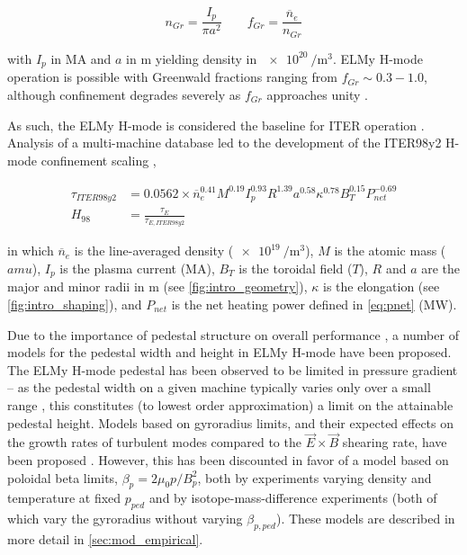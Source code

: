 \begin{equation}\label{eq:GDL}
  n_{Gr} = \frac{I_p}{\pi a^2} \qquad f_{Gr} = \frac{\overline{n}_e}{n_{Gr}}
\end{equation}

\noindent with $I_p$ in $\si{\mega\ampere}$ and $a$ in $\si{\meter}$ yielding density in $\SI{e20}{\per\meter\cubed}$.  ELMy H-mode operation is possible with Greenwald fractions ranging from $f_{Gr} \sim 0.3-1.0$, although confinement degrades severely as $f_{Gr}$ approaches unity \cite{Saibene1999}.

  As such, the ELMy H-mode is considered the baseline for ITER operation \cite{ITER1999,Shimada2007}.  Analysis of a multi-machine database \cite{Christiansen1992} led to the development of the ITER98y2 H-mode confinement scaling \cite{ITER1999},

\begin{align}
 \tau_{ITER98y2} &= 0.0562 \times \overline{n}_e^{0.41} M^{0.19} I_p^{0.93} R^{1.39} a^{0.58} \kappa^{0.78} B_T^{0.15} P_{net}^{-0.69}\label{eq:tau98}\\
 H_{98} &= \frac{\tau_E}{\tau_{E,ITER98y2}}\label{eq:H98}
\end{align}

\noindent in which $\overline{n}_e$ is the line-averaged density ($\SI{e19}{\per\meter\cubed}$), $M$ is the atomic mass ($\si{amu}$), $I_p$ is the plasma current ($\si{\mega\ampere}$), $B_T$ is the toroidal field ($\si{T}$), $R$ and $a$ are the major and minor radii in $\si{\meter}$ (see \cref{fig:intro_geometry}), $\kappa$ is the elongation (see \cref{fig:intro_shaping}), and $P_{net}$ is the net heating power defined in \cref{eq:pnet} ($\si{\mega\watt}$).

Due to the importance of pedestal structure on overall performance \cite{Kinsey2011}, a number of models for the pedestal width and height in ELMy H-mode have been proposed.  The ELMy H-mode pedestal has been observed to be limited in pressure gradient \cite{Connor1998,Urano2003} -- as the pedestal width on a given machine typically varies only over a small range \cite{Maggi2010,Schneider2013}, this constitutes (to lowest order approximation) a limit on the attainable pedestal height.  Models based on gyroradius limits, and their expected effects on the growth rates of turbulent modes compared to the $\vec{E}\times\vec{B}$ shearing rate, have been proposed \cite{Groebner1998a,Beurskens2011}.  However, this has been discounted in favor of a model based on poloidal beta limits, $\beta_p = 2\mu_0 p/B_p^2$, both by experiments varying density and temperature at fixed $p_{ped}$ \cite{Osborne1998} and by isotope-mass-difference experiments \cite{Urano2008} (both of which vary the gyroradius without varying $\beta_{
p,ped}$).  These models are described in more detail in \cref{sec:mod_empirical}.

